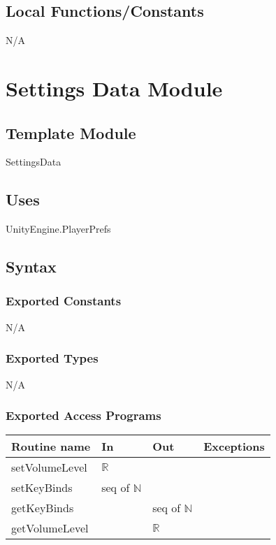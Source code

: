\documentclass[12pt]{article}
\begin{document}
\subsection{Local Functions/Constants}
N/A

\newpage

\section {Settings Data Module}

\subsection{Template Module}
SettingsData

\subsection {Uses}
UnityEngine.PlayerPrefs

\subsection {Syntax}

\subsubsection {Exported Constants}
N/A
\subsubsection {Exported Types}
N/A
\subsubsection {Exported Access Programs}

\begin{tabular}{| l | l | l | l |}
\hline
\textbf{Routine name} & \textbf{In} & \textbf{Out} & \textbf{Exceptions}\\
\hline
setVolumeLevel    &  $\mathbb{R}$         &           &          \\
\hline
setKeyBinds       &  seq of $\mathbb{N}$     &           &          \\
\hline
getKeyBinds       &           &      seq of $\mathbb{N}$     &          \\
\hline
getVolumeLevel       &           &    $\mathbb{R}$       &           \\
\hline
\end{tabular}
\end{document}
